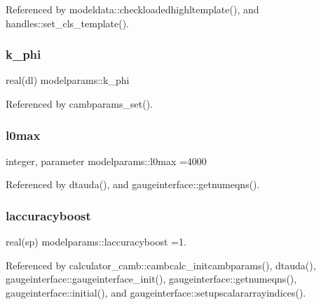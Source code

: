 Referenced by modeldata\+::checkloadedhighltemplate(), and handles\+::set\+\_\+cls\+\_\+template().

\mbox{\label{namespacemodelparams_acb822982115ab63eb32ad1374cbc13c0}} 
\subsubsection{\texorpdfstring{k\+\_\+phi}{k\_phi}}
{\footnotesize\ttfamily real(dl) modelparams\+::k\+\_\+phi}



Referenced by cambparams\+\_\+set().

\mbox{\label{namespacemodelparams_af523f2835472798b89ae123214d8fb99}} 
\subsubsection{\texorpdfstring{l0max}{l0max}}
{\footnotesize\ttfamily integer, parameter modelparams\+::l0max =4000}



Referenced by dtauda(), and gaugeinterface\+::getnumeqns().

\mbox{\label{namespacemodelparams_a670eec63b2ba5b17870ecc149c352d95}} 
\subsubsection{\texorpdfstring{laccuracyboost}{laccuracyboost}}
{\footnotesize\ttfamily real(sp) modelparams\+::laccuracyboost =1.}



Referenced by calculator\+\_\+camb\+::cambcalc\+\_\+initcambparams(), dtauda(), gaugeinterface\+::gaugeinterface\+\_\+init(), gaugeinterface\+::getnumeqns(), gaugeinterface\+::initial(), and gaugeinterface\+::setupscalararrayindices().

\mbox{\label{namespacemodelparams_adba219855fecf94eab76932919bad160}} 
